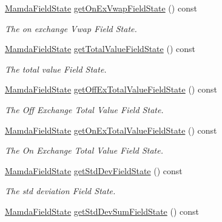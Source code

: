 \begin{CompactItemize}
\hyperlink{namespaceWombat_93aac974f2ab713554fd12a1fa3b7d2a}{Mamda\-Field\-State} \hyperlink{classWombat_1_1MamdaTradeListener_9b42325544667eb9015a42f1cbed4f72}{get\-On\-Ex\-Vwap\-Field\-State} () const 
\begin{CompactList}\small\item\em The on exchange Vwap Field State. \item\end{CompactList}\item 
\hyperlink{namespaceWombat_93aac974f2ab713554fd12a1fa3b7d2a}{Mamda\-Field\-State} \hyperlink{classWombat_1_1MamdaTradeListener_245a68b75564593c36b163aa87f5740b}{get\-Total\-Value\-Field\-State} () const 
\begin{CompactList}\small\item\em The total value Field State. \item\end{CompactList}\item 
\hyperlink{namespaceWombat_93aac974f2ab713554fd12a1fa3b7d2a}{Mamda\-Field\-State} \hyperlink{classWombat_1_1MamdaTradeListener_a47baf1358d91fa1b44bcf2f326f74ca}{get\-Off\-Ex\-Total\-Value\-Field\-State} () const 
\begin{CompactList}\small\item\em The Off Exchange Total Value Field State. \item\end{CompactList}\item 
\hyperlink{namespaceWombat_93aac974f2ab713554fd12a1fa3b7d2a}{Mamda\-Field\-State} \hyperlink{classWombat_1_1MamdaTradeListener_63ff116bb1922942926fedde13e4c2f4}{get\-On\-Ex\-Total\-Value\-Field\-State} () const 
\begin{CompactList}\small\item\em The On Exchange Total Value Field State. \item\end{CompactList}\item 
\hyperlink{namespaceWombat_93aac974f2ab713554fd12a1fa3b7d2a}{Mamda\-Field\-State} \hyperlink{classWombat_1_1MamdaTradeListener_dccc4da383c8a20f86ce59d774e55778}{get\-Std\-Dev\-Field\-State} () const 
\begin{CompactList}\small\item\em The std deviation Field State. \item\end{CompactList}\item 
\hyperlink{namespaceWombat_93aac974f2ab713554fd12a1fa3b7d2a}{Mamda\-Field\-State} \hyperlink{classWombat_1_1MamdaTradeListener_2daad489d3cda802d7555b5f9edc0822}{get\-Std\-Dev\-Sum\-Field\-State} () const 

\end{CompactItemize}
